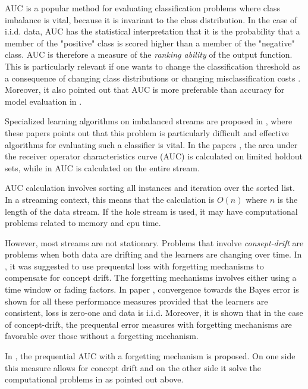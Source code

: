 AUC is a popular method for evaluating classification problems where class imbalance is vital, because it is invariant to the class distribution. In the case of i.i.d. data, AUC has the statistical interpretation that it is the probability that a member of the "positive" class is scored higher than a member of the "negative" class.  AUC is therefore a measure of the \emph{ranking ability} of the output function.  This is particularly relevant if one wants to change the classification threshold as a consequence of changing class distributions or  changing misclassification costs \cite{Wu07}.  Moreover, it also pointed out that AUC is more preferable than accuracy for model evaluation in \cite{Gam10}.  

Specialized learning algorithms on imbalanced streams are proposed in \cite{Dit13, Hoe12, Lic10}, where these papers points out that this problem is particularly difficult and effective algorithms for evaluating such a classifier is vital.  In the papers \cite{Dit13, Lic10}, the area under the receiver operator characteristics curve (AUC) is calculated on limited holdout sets, while in \cite{Hoe12} AUC is calculated on the entire stream.

AUC calculation involves sorting all instances and iteration over the sorted list.  In a streaming context, this means that the calculation is $O(n)$ where $n$ is the length of the data stream.  If the hole stream is used, it may have computational problems related to memory and cpu time.  

However, most streams are not stationary.  Problems that involve \emph{consept-drift} are problems when both data are drifting and the learners are changing over time.  In \cite{Gam13}, it was suggested to use prequental loss with forgetting mechanisms to compensate for concept drift. The forgetting mechanisms involves either using a time window or fading factors.  In paper \cite{Gam13}, convergence towards the Bayes error is shown for all these performance measures provided that the learners are consistent, loss is zero-one and data is i.i.d.  Moreover, it is shown that in the case of concept-drift, the prequental error measures with forgetting mechanisms are favorable over those without a forgetting mechanism.

In \cite{Brz14}, the prequential AUC with a forgetting mechanism is proposed.  On one side this measure allows for concept drift and on the other side it solve the computational problems in \cite{Dit13, Hoe12, Lic10} as pointed out above.

